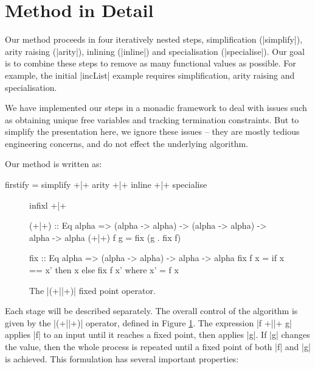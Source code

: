 \section{Method in Detail}
\label{secF:detailed}

\begin{comment}
\begin{code}
data Prog = Prog deriving Eq
simplify,arity,inline,specialise :: Prog -> Prog
\end{code}
\end{comment}

Our method proceeds in four iteratively nested steps, simplification (|simplify|), arity raising (|arity|), inlining (|inline|) and specialisation (|specialise|). Our goal is to combine these steps to remove as many functional values as possible. For example, the initial |incList| example requires simplification, arity raising and specialisation.

We have implemented our steps in a monadic framework to deal with issues such as obtaining unique free variables and tracking termination constraints. But to simplify the presentation here, we ignore these issues -- they are mostly tedious engineering concerns, and do not effect the underlying algorithm.

Our method is written as:

\begin{code}
firstify = simplify +|+ arity +|+ inline +|+ specialise
\end{code}

\begin{figure}
\begin{code}
infixl +|+

(+|+) :: Eq alpha => (alpha -> alpha) -> (alpha -> alpha) -> alpha -> alpha
(+|+) f g = fix (g . fix f)

fix :: Eq alpha => (alpha -> alpha) -> alpha -> alpha
fix f x = if x == x' then x else fix f x'
    where x' = f x
\end{code}
\caption{The |(+||+)| fixed point operator.}
\label{figF:fixp_op}
\end{figure}

Each stage will be described separately. The overall control of the algorithm is given by the |(+||+)| operator, defined in Figure \ref{figF:fixp_op}. The expression |f +||+ g| applies |f| to an input until it reaches a fixed point, then applies |g|. If |g| changes the value, then the whole process is repeated until a fixed point of both |f| and |g| is achieved. This formulation has several important properties:

